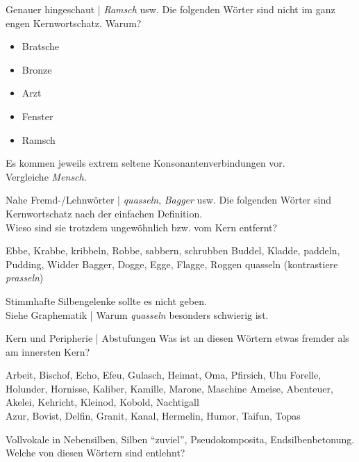 \begin{frame}
  {Genauer hingeschaut | \textit{Ramsch} usw.}
  \onslide<+->
  \onslide<+->
  Die folgenden Wörter sind nicht im ganz engen Kernwortschatz. Warum?\\
  \Zeile
  \begin{itemize}[<+->]
    \item Bratsche
    \item Bronze
    \item Arzt
    \item Fenster
    \item Ramsch
  \end{itemize}
  \onslide<+->
  \Zeile
  Es kommen jeweils \alert{extrem seltene Konsonantenverbindungen} vor.\\
  \onslide<+->
  Vergleiche \alert{\textit{Mensch}}.
\end{frame}

\begin{frame}
  {Nahe Fremd-\slash Lehnwörter | \textit{quasseln}, \textit{Bagger} usw.}
  \onslide<+->
  \onslide<+->
  Die folgenden Wörter sind Kernwortschatz nach der einfachen Definition.\\
  Wieso sind sie trotzdem ungewöhnlich bzw. vom Kern entfernt?\\
  \Zeile
  \onslide<+->
  \begin{exe}
    \ex Ebbe, Krabbe, kribbeln, Robbe, sabbern, schrubben
    \ex Buddel, Kladde, paddeln, Pudding, Widder
    \ex Bagger, Dogge, Egge, Flagge, Roggen
    \Halbzeile
    \ex quasseln (kontrastiere \textit{prasseln})
  \end{exe}
  \onslide<+->
  \Zeile
  \alert{Stimmhafte Silbengelenke} sollte es nicht geben.\\
  Siehe Graphematik | Warum \textit{quasseln} besonders schwierig ist.
\end{frame}

\begin{frame}
  {Kern und Peripherie | Abstufungen}
  \onslide<+->
  \onslide<+->
  Was ist an diesen Wörtern etwas fremder als am innersten Kern?\\
  \Halbzeile
  \begin{exe}
    \ex Arbeit, Bischof, Echo, Efeu, Gulasch, Heimat, Oma, Pfirsich, Uhu
    \onslide<+->
    \ex Forelle, Holunder, Hornisse, Kaliber, Kamille, Marone, Maschine
    \onslide<+->
    \ex Ameise, Abenteuer, Akelei, Kehricht, Kleinod, Kobold, Nachtigall\\
    \onslide<+->
    \ex Azur, Bovist, Delfin, Granit, Kanal, Hermelin, Humor, Taifun, Topas
  \end{exe}
  \onslide<+->
  \Zeile
  \alert{Vollvokale} in Nebensilben, \alert{Silben "`zuviel"'}, \alert{Pseudokomposita}, \alert{Endsilbenbetonung}.\\
  \Halbzeile
  \onslide<+->
  Welche von diesen Wörtern sind entlehnt?
\end{frame}

